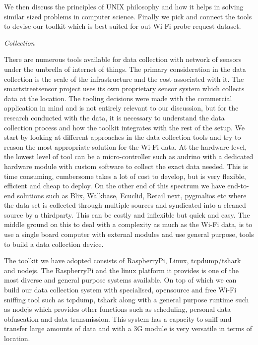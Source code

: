 We then discuss the principles of UNIX philosophy and how it helps in solving similar sized problems in computer science. Finally we pick and connect the tools to devise our toolkit which is best suited for out Wi-Fi probe request dataset.


\vspace{1.5em}\noindent\textit{Collection}\vspace{0.5em}

There are numerous tools available for data collection with network of sensors under the umbrella of internet of things.
The primary consideration in the data collection is the scale of the infrastructure and the cost associated with it.
The smartstreetsensor project uses its own proprietary sensor system which collects data at the location.
The tooling decisions were made with the commercial application in mind and is not entirely relevant to our discussion, but for the research conducted with the data, it is necessary to understand the data collection process and how the toolkit integrates with the rest of the setup.
We start by looking at different approaches in the data collection tools and try to reason the most appropriate solution for the Wi-Fi data.
At the hardware level, the lowest level of tool can be a micro-controller such as audrino with a dedicated hardware module with custom software to collect the exact data needed.
This is time consuming, cumbersome takes a lot of cost to develop, but is very flexible, efficient and cheap to deploy.
On the other end of this spectrum we have end-to-end solutions such as Blix, Walkbase, Ecuclid, Retail next, pygmalios etc where the data set is collected through multiple sources and syndicated into a cleaned source by a thirdparty.
This can be costly and inflexible but quick and easy.
The middle ground on this to deal with a complexity as much as the Wi-Fi data, is to use a single board computer with external modules and use general purpose, tools to build a data collection device.

The toolkit we have adopted consists of RaspberryPi, Linux, tcpdump/tshark and nodejs.
The RaspberryPi and the linux platform it provides is one of the most diverse and general purpose systems available.
On top of which we can build our data collection system with specialised, opensource and free Wi-Fi sniffing tool such as tcpdump, tshark along with a general purpose runtime such as nodejs which provides other functions such as scheduling, personal data obfuscation and data transmission.
This system has a capacity to sniff and transfer large amounts of data and with a 3G module is very versatile in terms of location.

